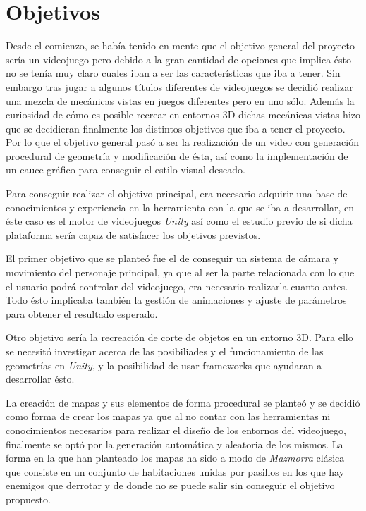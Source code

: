 \chapter{Objetivos}
\label{chap:objetivos}

Desde el comienzo, se había tenido en mente que el objetivo general del proyecto sería un videojuego pero debido a la gran cantidad de opciones que implica ésto no se tenía muy claro cuales iban a ser las características que iba a tener. Sin embargo tras jugar a algunos títulos diferentes de videojuegos se decidió realizar una mezcla de  mecánicas vistas en juegos diferentes pero en uno sólo. Además la curiosidad de cómo es posible recrear en entornos 3D dichas mecánicas vistas hizo que se decidieran finalmente los distintos objetivos que iba a tener el proyecto. Por lo que el objetivo general pasó a ser la realización de un video con generación procedural de geometría y modificación de ésta, así como la implementación de un cauce gráfico para conseguir el estilo visual deseado.

Para conseguir realizar el objetivo principal, era necesario adquirir una base de conocimientos y experiencia en la herramienta con la que se iba a desarrollar, en éste caso es el motor de videojuegos \textit{Unity} así como el estudio previo de si dicha plataforma sería capaz de satisfacer los objetivos previstos.

El primer objetivo que se planteó fue el de conseguir un sistema de cámara y movimiento del personaje principal, ya que al ser la parte relacionada con lo que el usuario podrá controlar del videojuego, era necesario realizarla cuanto antes. Todo ésto implicaba también la gestión de animaciones y ajuste de parámetros para obtener el resultado esperado.

Otro objetivo sería la recreación de corte de objetos en un entorno 3D. Para ello se necesitó investigar acerca de las posibiliades y el funcionamiento de las geometrías en \textit{Unity}, y la posibilidad de usar frameworks que ayudaran a desarrollar ésto.

La creación de mapas y sus elementos de forma procedural se planteó y se decidió como forma de crear los mapas ya que al no contar con las herramientas ni conocimientos necesarios para realizar el diseño de los entornos del videojuego, finalmente se optó por la generación automática y aleatoria de los mismos. La forma en la que han planteado los mapas ha sido a modo de \textit{Mazmorra} clásica que consiste en un conjunto de habitaciones unidas por pasillos en los que hay enemigos que derrotar y de donde no se puede salir sin conseguir el objetivo propuesto.

